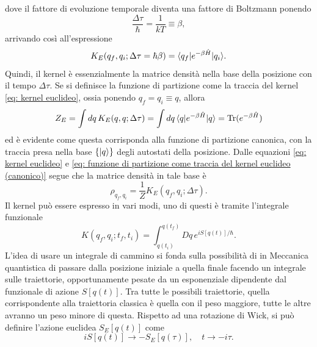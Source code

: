 dove il fattore di evoluzione temporale diventa una fattore di Boltzmann ponendo
\begin{equation}
    \frac{\Delta\tau}{\hbar} = \frac{1}{kT} \equiv \beta,
\end{equation}
arrivando così all'espressione
\begin{equation}
\label{eq: kernel euclideo}
     K_E(q_f,q_i;\Delta\tau = \hbar\beta) = \langle q_f | e^{-\beta\hat{H}} | q_i \rangle.
\end{equation}
Quindi, il kernel è essenzialmente la matrice densità nella base della posizione con il tempo $\Delta\tau$. Se si definisce la funzione di partizione come la traccia del kernel \eqref{eq: kernel euclideo}, ossia ponendo $q_f = q_i \equiv q$, allora
\begin{equation}
\label{eq: funzione di partizione come traccia del kernel euclideo (canonico)}
    Z_E = \int dq\,K_E(q,q;\Delta\tau) = \int dq\,\langle q | e^{-\beta\hat{H}} | q \rangle = \mathrm{Tr}(e^{-\beta\hat{H}})
\end{equation}
ed è evidente come questa corrisponda alla funzione di partizione canonica, con la traccia presa nella base $\{\ket{q}\}$ degli autostati della posizione. Dalle equazioni \eqref{eq: kernel euclideo} e \eqref{eq: funzione di partizione come traccia del kernel euclideo (canonico)} segue che la matrice densità in tale base è
\begin{equation}
\label{eq: matrice densità in termini del kernel (canonico)}
    \rho_{q_f,q_i} = \frac{1}{Z}K_E(q_f,q_i;\Delta\tau).
\end{equation}
Il kernel può essere espresso in vari modi, uno di questi è tramite l'integrale funzionale
\begin{equation}
\label{eq: kernel come integrale funzionale}
    K(q_f,q_i;t_f,t_i) = \int_{q(t_i)}^{q(t_f)} Dq\,e^{iS[q(t)]/\hbar}.
\end{equation}
L'idea di usare un integrale di cammino si fonda sulla possibilità di in Meccanica quantistica di passare dalla posizione iniziale a quella finale facendo un integrale sulle traiettorie, opportunamente pesate da un esponenziale dipendente dal funzionale di azione $S[q(t)]$. Tra tutte le possibili traiettorie, quella corrispondente alla traiettoria classica è quella con il peso maggiore, tutte le altre avranno un peso minore di questa. Rispetto ad una rotazione di Wick, si può definire l'azione euclidea $S_E[q(t)]$ come
\begin{equation}
    iS[q(t)] \to -S_E[q(\tau)],\quad t \to -i\tau.
\end{equation}
